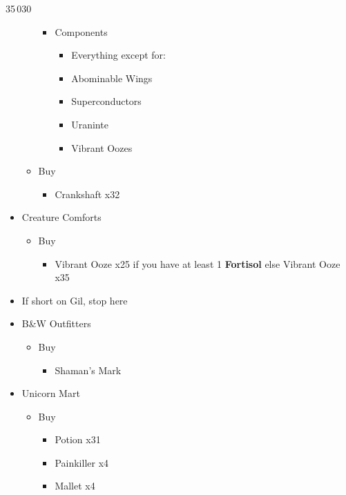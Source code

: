 \begin{multicols}{2}
\begin{shop}{35\,030}
\begin{itemize}
\begin{itemize}
\begin{itemize}
\begin{itemize}
            \end{itemize}
            \item Components
            \begin{itemize}
                \item Everything except for:
                \item Abominable Wings
                \item Superconductors
                \item Uraninte
                \item Vibrant Oozes
            \end{itemize}
        \end{itemize}
        \item Buy
        \begin{itemize}
            \item Crankshaft x32
        \end{itemize}
    \end{itemize}
    \item Creature Comforts
    \begin{itemize}
        \item Buy
        \begin{itemize}
            \item Vibrant Ooze x25 if you have at least 1 \textbf{Fortisol} else Vibrant Ooze x35
        \end{itemize}
    \end{itemize}
    \item If short on Gil, stop here
    \item B\&W Outfitters
    \begin{itemize}
        \item Buy
        \begin{itemize}
            \item Shaman's Mark
        \end{itemize}
    \end{itemize}
    \item Unicorn Mart
    \begin{itemize}
        \item Buy
        \begin{itemize}
            \item Potion x31
            \item Painkiller x4
            \item Mallet x4
        \end{itemize}
    \end{itemize}
\end{itemize}
\end{shop}


\end{multicols}
